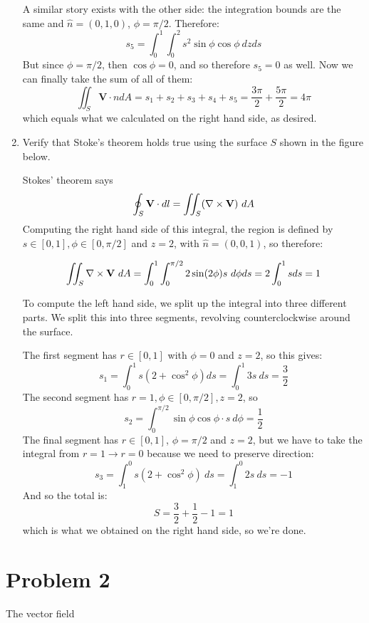 \documentclass[10pt]{article}
\begin{document}
\begin{enumerate}[label= (\alph*), resume]
\begin{solution}
            A similar story exists with the other side: the integration bounds are the same and $\hat n = (0, 1, 0)$, $\phi = \pi/2$. Therefore: 
            \[ s_5 = \int_0^1 \int_0^2 s^2 \sin \phi \cos \phi \ dz ds\] 
            But since $\phi = \pi/2$, then $\cos \phi = 0$, and so therefore $s_5 = 0$ as well. Now we can finally take the sum of all of them:
            \[ \iint_S \mathbf V \cdot n dA = s_1 + s_2 + s_3 + s_4 + s_5 = \frac{3\pi}{2} + \frac{5\pi}{2} = 4\pi\] 
            which equals what we calculated on the right hand side, as desired.
        \end{solution}
        \item Verify that Stoke's theorem holds true using the surface $S$ shown in the figure below.
        
        \begin{solution}
            Stokes' theorem says 
            \[ \oint_S \mathbf V \cdot dl = \iint_S (\nabla \times \mathbf V)\  dA\]
            Computing the right hand side of this integral, the region is defined by $s \in [0, 1], \phi \in [0, \pi/2]$ and $z = 2$, with $\hat n = (0, 0, 1)$, so therefore: 

            \[ \iint_S \nabla \times \mathbf V \ dA = \int_0^1 \int_0^{\pi/2} 2\sin(2\phi)s \ d\phi ds = 2\int_0^1 s ds = 1\]
            
            To compute the left hand side, we split up the integral into three different parts. We split this into three segments, revolving counterclockwise around the surface. 

            The first segment has $r \in [0, 1]$ with $\phi = 0$ and $z = 2$, so this gives:
            \[ s_1 = \int_0^1 s(2 + \cos^2 \phi) ds = \int_0^1 3s \ ds = \frac 32\]
            The second segment has $r = 1, \phi \in [0, \pi/2], z = 2$, so 
            \[ s_2 = \int_0^{\pi/2} \sin \phi \cos \phi \cdot s \ d\phi = \frac 12\]
            The final segment has $r \in [0, 1]$, $\phi = \pi/2$ and $z = 2$, but we have to take the integral from $r = 1 \to r = 0$ because we need to preserve direction:
            \[ s_3 = \int_1^0 s(2 + \cos^2 \phi) \ ds = \int_1^0 2s \ ds = -1\]
            And so the total is:
            \[ S = \frac 32 + \frac 12 - 1 = 1\] 
            which is what we obtained on the right hand side, so we're done.
        \end{solution}
    \end{enumerate}

    \pagebreak

    \section*{Problem 2}
    The vector field 
\end{document}
